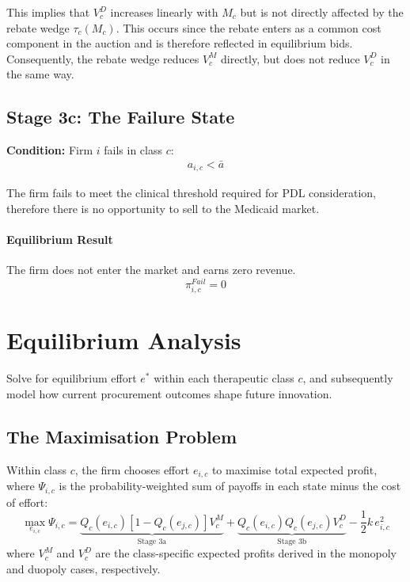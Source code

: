 \documentclass[12pt]{article}
\begin{document}
This implies that $V_c^D$ increases linearly with $M_c$ but is not directly affected by the rebate wedge $\tau_c(M_c)$. This occurs since the rebate enters as a common cost component in the auction and is therefore reflected in equilibrium bids. Consequently, the rebate wedge reduces $V_c^M$ directly, but does not reduce $V_c^D$ in the same way.

\subsection{Stage 3c: The Failure State}
\textbf{Condition:} Firm $i$ fails in class $c$:
\begin{align*}
    a_{i,c} < \bar{a}
\end{align*}

The firm fails to meet the clinical threshold required for PDL consideration, therefore there is no opportunity to sell to the Medicaid market.

\paragraph{Equilibrium Result}
The firm does not enter the market and earns zero revenue.
\begin{equation}
    \pi_{i,c}^{Fail} = 0
\end{equation}

\newpage

\section{Equilibrium Analysis}
Solve for equilibrium effort $e^*$ within each therapeutic class $c$, and subsequently model how current procurement outcomes shape future innovation.

\subsection{The Maximisation Problem}
Within class $c$, the firm chooses effort $e_{i,c}$ to maximise total expected profit, where $\Psi_{i,c}$ is the probability-weighted sum of payoffs in each state minus the cost of effort:
\begin{equation}
    \max_{e_{i,c}} \Psi_{i,c} = \underbrace{Q_c(e_{i,c})[1-Q_c(e_{j,c})] V_c^M}_{\text{Stage 3a}} + \underbrace{Q_c(e_{i,c})Q_c(e_{j,c}) V_c^D}_{\text{Stage 3b}} - \frac{1}{2} k \, e_{i,c}^2
\end{equation}
where $V_c^M$ and $V_c^D$ are the class-specific expected profits derived in the monopoly and duopoly cases, respectively.
\end{document}
